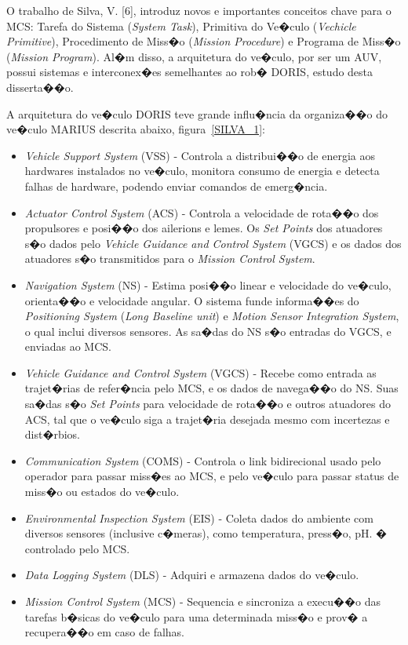 O trabalho de Silva, V. [6], introduz novos e importantes conceitos chave para o
MCS: Tarefa do Sistema (\emph{System Task}), Primitiva do
Ve�culo (\emph{Vechicle Primitive}), Procedimento de Miss�o (\emph{Mission Procedure})
e Programa de Miss�o (\emph{Mission Program}). Al�m disso, a arquitetura do
ve�culo, por ser um AUV, possui sistemas e interconex�es
semelhantes ao rob� DORIS, estudo desta disserta��o.

A arquitetura do ve�culo DORIS teve grande influ�ncia da organiza��o do ve�culo
MARIUS descrita abaixo, figura~\ref{SILVA_1}:
\begin{itemize}
  \item \emph{Vehicle Support System} (VSS) - Controla a distribui��o de energia
  aos hardwares instalados no ve�culo, monitora consumo de energia e detecta
  falhas de hardware, podendo enviar comandos de emerg�ncia.
  \item \emph{Actuator Control System} (ACS) - Controla a velocidade de rota��o
  dos propulsores e posi��o dos ailerions e lemes. Os \emph{Set Points} dos
  atuadores s�o dados pelo \emph{Vehicle Guidance and Control System} (VGCS) e
  os dados dos atuadores s�o transmitidos para o \emph{Mission Control System}.
  \item \emph{Navigation System} (NS) - Estima posi��o linear e velocidade do
  ve�culo, orienta��o e velocidade angular. O sistema funde informa��es do
  \emph{Positioning System} (\emph{Long Baseline unit}) e \emph{Motion Sensor
  Integration System}, o qual inclui diversos sensores. As sa�das do NS s�o
  entradas do VGCS, e enviadas ao MCS.
  \item \emph{Vehicle Guidance and Control System} (VGCS) - Recebe como entrada
  as trajet�rias de refer�ncia pelo MCS, e os dados de navega��o do NS. Suas
  sa�das s�o \emph{Set Points} para velocidade de rota��o e outros atuadores do
  ACS, tal que o ve�culo siga a trajet�ria desejada mesmo com incertezas e
  dist�rbios.
  \item \emph{Communication System} (COMS) - Controla o link bidirecional usado
  pelo operador para passar miss�es ao MCS, e pelo ve�culo para passar status de
  miss�o ou estados do ve�culo.
  \item \emph{Environmental Inspection System} (EIS) - Coleta dados do ambiente
  com diversos sensores (inclusive c�meras), como temperatura, press�o, pH. �
  controlado pelo MCS.
  \item \emph{Data Logging System} (DLS) - Adquiri e armazena dados do ve�culo.
  \item \emph{Mission Control System} (MCS) - Sequencia e sincroniza a execu��o
  das tarefas b�sicas do ve�culo para uma determinada miss�o e prov� a
  recupera��o em caso de falhas.
\end{itemize}

